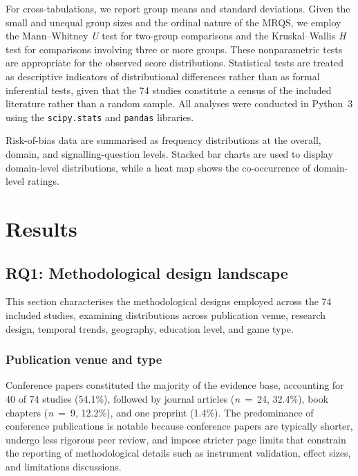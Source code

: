 \documentclass[etq]{acnsart}
\begin{document}
	For cross-tabulations, we report group means and standard deviations. Given the small and unequal group sizes and the ordinal nature of the MRQS, we employ the Mann--Whitney \textit{U} test for two-group comparisons and the Kruskal--Wallis \textit{H} test for comparisons involving three or more groups. These nonparametric tests are appropriate for the observed score distributions. Statistical tests are treated as descriptive indicators of distributional differences rather than as formal inferential tests, given that the 74 studies constitute a census of the included literature rather than a random sample. All analyses were conducted in Python~3 using the \texttt{scipy.stats} and \texttt{pandas} libraries.
	
	Risk-of-bias data are summarised as frequency distributions at the overall, domain, and signalling-question levels. Stacked bar charts are used to display domain-level distributions, while a heat map shows the co-occurrence of domain-level ratings.
	
	
	
	\section{Results}
	\label{sec:results}
	
	\subsection{RQ1: Methodological design landscape}
	\label{sec:results_rq1}
	
	This section characterises the methodological designs employed across the 74 included studies, examining distributions across publication venue, research design, temporal trends, geography, education level, and game type.
	
	\subsubsection{Publication venue and type}
	\label{sec:results_rq1_venue}
	
	Conference papers constituted the majority of the evidence base, accounting for 40 of 74 studies (54.1\%), followed by journal articles (\textit{n}~=~24, 32.4\%), book chapters (\textit{n}~=~9, 12.2\%), and one preprint (1.4\%). The predominance of conference publications is notable because conference papers are typically shorter, undergo less rigorous peer review, and impose stricter page limits that constrain the reporting of methodological details such as instrument validation, effect sizes, and limitations discussions.
	
\end{document}
